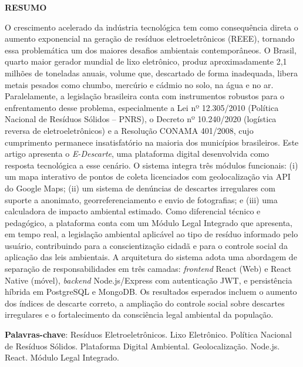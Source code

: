 \documentclass[12pt, a4paper]{article}
\numberwithin{equation}{section}
\numberwithin{figure}{section}
\numberwithin{table}{section}
\begin{document}
\begin{center}
  {\normalsize\bfseries RESUMO}
\end{center}
\noindent
O crescimento acelerado da indústria tecnológica tem como consequência direta
o aumento exponencial na geração de resíduos eletroeletrônicos (REEE), tornando
essa problemática um dos maiores desafios ambientais contemporâneos. O Brasil,
quarto maior gerador mundial de lixo eletrônico, produz aproximadamente 2,1
milhões de toneladas anuais, volume que, descartado de forma inadequada, libera
metais pesados como chumbo, mercúrio e cádmio no solo, na água e no ar.
Paralelamente, a legislação brasileira conta com instrumentos robustos para
o enfrentamento desse problema, especialmente a Lei nº 12.305/2010 (Política
Nacional de Resíduos Sólidos -- PNRS), o Decreto nº 10.240/2020 (logística
reversa de eletroeletrônicos) e a Resolução CONAMA 401/2008, cujo cumprimento
permanece insatisfatório na maioria dos municípios brasileiros. Este artigo
apresenta o \textit{E-Descarte}, uma plataforma digital desenvolvida como
resposta tecnológica a esse cenário. O sistema integra três módulos funcionais:
(i) um mapa interativo de pontos de coleta licenciados com geolocalização via
API do Google Maps; (ii) um sistema de denúncias de descartes irregulares com
suporte a anonimato, georreferenciamento e envio de fotografias; e (iii) uma
calculadora de impacto ambiental estimado. Como diferencial técnico e pedagógico,
a plataforma conta com um Módulo Legal Integrado que apresenta, em tempo real,
a legislação ambiental aplicável ao tipo de resíduo informado pelo usuário,
contribuindo para a conscientização cidadã e para o controle social da aplicação
das leis ambientais. A arquitetura do sistema adota uma abordagem de separação
de responsabilidades em três camadas: \textit{frontend} React (Web) e React
Native (móvel), \textit{backend} Node.js/Express com autenticação JWT, e
persistência híbrida em PostgreSQL e MongoDB. Os resultados esperados incluem
o aumento dos índices de descarte correto, a ampliação do controle social sobre
descartes irregulares e o fortalecimento da consciência legal ambiental da
população.

\vspace{0.5cm}
\noindent
\textbf{Palavras-chave}: Resíduos Eletroeletrônicos. Lixo Eletrônico. Política
Nacional de Resíduos Sólidos. Plataforma Digital Ambiental. Geolocalização.
Node.js. React. Módulo Legal Integrado.

\clearpage
\end{document}
